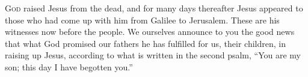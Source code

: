 
\lettrine{G}{od} raised Jesus from the dead, and for many days thereafter Jesus appeared to those who had come up with him from Galilee to Jerusalem. These are his witnesses now before the people. We ourselves announce to you the good news that what God promised our fathers he has fulfilled for us, their children, in raising up Jesus, according to what is written in the second psalm, “You are my son; this day I have begotten you.”